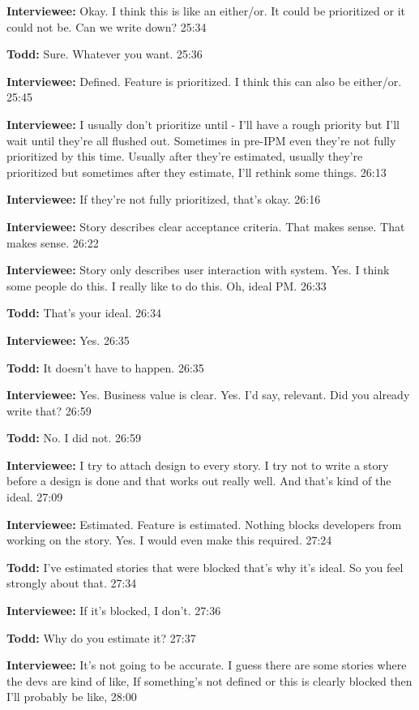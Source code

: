 \textbf{Interviewee:} Okay. I think this is like an either/or. It could be prioritized or it could not be. Can we write down? 25:34

\textbf{Todd:} Sure. Whatever you want. 25:36

\textbf{Interviewee:} Defined. Feature is prioritized. I think this can also be either/or. 25:45

\textbf{Interviewee:} I usually don't prioritize until - I'll have a rough priority but I'll wait until they're all flushed out. Sometimes in pre-IPM even they're not fully prioritized by this time. Usually after they're estimated, usually they're prioritized but sometimes after they estimate, I'll rethink some things. 26:13

\textbf{Interviewee:} If they're not fully prioritized, that's okay. 26:16

\textbf{Interviewee:} Story describes clear acceptance criteria. That makes sense. That makes sense. 26:22

\textbf{Interviewee:} Story only describes user interaction with system. Yes. I think some people do this. I really like to do this. Oh, ideal PM. 26:33

\textbf{Todd:} That's your ideal. 26:34

\textbf{Interviewee:} Yes. 26:35

\textbf{Todd:} It doesn't have to happen. 26:35

\textbf{Interviewee:} Yes. Business value is clear. Yes. I'd say, relevant. Did you already write that? 26:59

\textbf{Todd:} No. I did not. 26:59

\textbf{Interviewee:} I try to attach design to every story. I try not to write a story before a design is done and that works out really well. And that's kind of the ideal. 27:09

\textbf{Interviewee:} Estimated. Feature is estimated. Nothing blocks developers from working on the story. Yes. I would even make this required. 27:24

\textbf{Todd:} I've estimated stories that were blocked that's why it's ideal. So you feel strongly about that. 27:34

\textbf{Interviewee:} If it's blocked, I don't. 27:36

\textbf{Todd:} Why do you estimate it? 27:37

\textbf{Interviewee:} It's not going to be accurate. I guess there are some stories where the devs are kind of like,  If something's not defined or this is clearly blocked then I'll probably be like,  28:00

